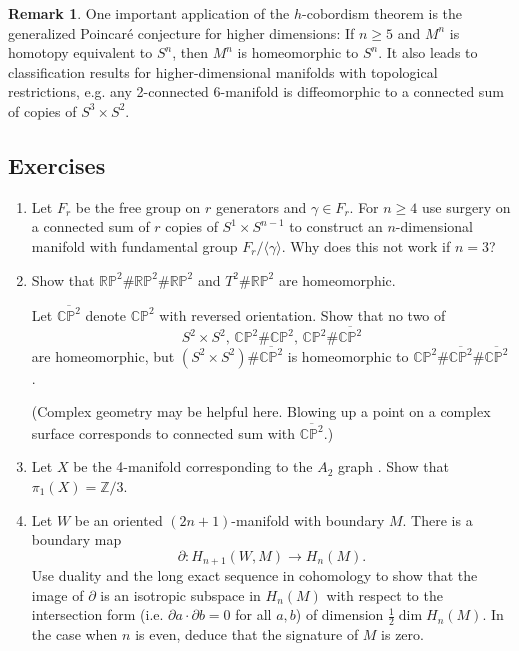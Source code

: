 \documentclass{article}
\theoremstyle{definition}
\newtheorem*{remark}{Remark}
\newcommand{\RP}{\mathbb{RP}}
\newcommand{\CP}{\mathbb{CP}}
\newcommand{\Z}{\mathbb{Z}}
\begin{document}
\begin{remark}
    One important application of the $h$-cobordism theorem is the generalized
    Poincar\'e conjecture for higher dimensions: If $n\ge5$ and $M^n$ is
    homotopy equivalent to $S^n$, then $M^n$ is homeomorphic to $S^n$. It also
    leads to classification results for higher-dimensional manifolds with
    topological restrictions, e.g. any 2-connected 6-manifold is diffeomorphic
    to a connected sum of copies of $S^3\times S^2$.
\end{remark}

\subsection*{Exercises}

\begin{enumerate}
    \item Let $F_r$ be the free group on $r$ generators and $\gamma\in F_r$. For
        $n\ge4$ use surgery on a connected sum of $r$ copies of
        $S^1\times S^{n-1}$ to construct an $n$-dimensional manifold with
        fundamental group $F_r/\langle\gamma\rangle$. Why does this not work if
        $n=3$?

    \item Show that $\RP^2\#\RP^2\#\RP^2$ and $T^2\#\RP^2$ are homeomorphic.

        Let $\overline{\CP^2}$ denote $\CP^2$ with reversed orientation. Show
        that no two of
        \begin{equation*}
            S^2\times S^2,\,\CP^2\#\CP^2,\,\CP^2\#\overline{\CP^2}
        \end{equation*}
        are homeomorphic, but $(S^2\times S^2)\#\overline{\CP^2}$ is
        homeomorphic to $\CP^2\#\overline{\CP^2}\#\overline{\CP^2}$.

        (Complex geometry may be helpful here. Blowing up a point on a complex
        surface corresponds to connected sum with $\overline{\CP^2}$.)

    \item Let $X$ be the 4-manifold corresponding to the $A_2$ graph
        . Show that $\pi_1(X)=\Z/3$.

    \item Let $W$ be an oriented $(2n+1)$-manifold with boundary $M$. There is a
        boundary map
        \begin{equation*}
            \partial:H_{n+1}(W,M)\to H_n(M).
        \end{equation*}
        Use duality and the long exact sequence in cohomology to show that the
        image of $\partial$ is an isotropic subspace in $H_n(M)$ with respect to
        the intersection form (i.e. $\partial a\cdot\partial b=0$ for all $a,b$)
        of dimension $\frac{1}{2}\dim H_n(M)$. In the case when $n$ is even,
        deduce that the signature of $M$ is zero.


\end{enumerate}
\end{document}

